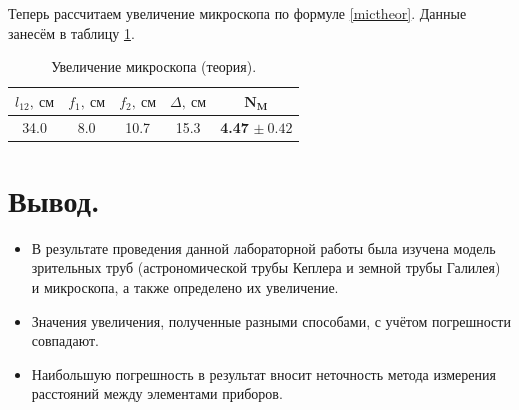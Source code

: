 \documentclass[a4paper, 12pt, twoside]{article}
\begin{document}
Теперь рассчитаем увеличение микроскопа по формуле \eqref{mictheor}. Данные занесём в таблицу \ref{t10}.

\begin{table}[H]
	\centering
	\caption{Увеличение микроскопа (теория).}
	\label{t10}
	\begin{tabular}{c|c|c|c|c} \toprule
		$l_{12},~\text{см}$ & $f_1,~\text{см}$ & $f_2,~\text{см}$ & $\Delta,~\text{см}$ &$\mathbf{N_M}$ \\ \midrule
		34.0                & 8.0              & 10.7             & 15.3                & \textbf{4.47} $\pm~0.42$ \\ \bottomrule
	\end{tabular}
\end{table}

\section{Вывод.}
\begin{itemize}
	\item В результате проведения данной лабораторной работы была изучена модель зрительных труб (астрономической трубы Кеплера и земной трубы Галилея) и микроскопа, а также определено их увеличение.
	
	\item Значения увеличения, полученные разными способами, с учётом погрешности совпадают.
	
	\item Наибольшую погрешность в результат вносит неточность метода измерения расстояний между элементами приборов.
\end{itemize}
\end{document}
